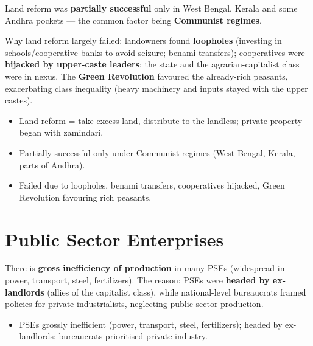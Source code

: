 \begin{DataFact}
Land reform was \textbf{partially successful} only in West Bengal, Kerala and some Andhra pockets --- the common factor being \textbf{Communist regimes}.
\end{DataFact}

Why land reform largely failed: landowners found \textbf{loopholes} (investing in schools/cooperative banks to avoid seizure; benami transfers); cooperatives were \textbf{hijacked by upper-caste leaders}; the state and the agrarian-capitalist class were in nexus. The \textbf{Green Revolution} favoured the already-rich peasants, exacerbating class inequality (heavy machinery and inputs stayed with the upper castes).

\begin{QuickRevision}
\begin{itemize}
\item Land reform = take excess land, distribute to the landless; private property began with zamindari.
\item Partially successful only under Communist regimes (West Bengal, Kerala, parts of Andhra).
\item Failed due to loopholes, benami transfers, cooperatives hijacked, Green Revolution favouring rich peasants.
\end{itemize}
\end{QuickRevision}

\section{Public Sector Enterprises}

\begin{CriticalPoint}
There is \textbf{gross inefficiency of production} in many PSEs (widespread in power, transport, steel, fertilizers). The reason: PSEs were \textbf{headed by ex-landlords} (allies of the capitalist class), while national-level bureaucrats framed policies for private industrialists, neglecting public-sector production.
\end{CriticalPoint}

\begin{QuickRevision}
\begin{itemize}
\item PSEs grossly inefficient (power, transport, steel, fertilizers); headed by ex-landlords; bureaucrats prioritised private industry.
\end{itemize}
\end{QuickRevision}


